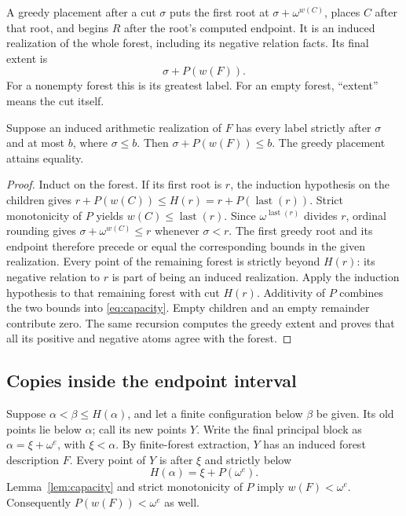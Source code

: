 \documentclass[11pt]{article}
\begin{document}
A greedy placement after a cut $\sigma$ puts the first root at
$\sigma+\omega^{w(C)}$, places $C$ after that root, and begins $R$
after the root's computed endpoint. It is an induced realization of the
whole forest, including its negative relation facts. Its final extent is
\begin{equation}\label{eq:capacity}
 \sigma+P(w(F)).
\end{equation}
For a nonempty forest this is its greatest label. For an empty forest,
``extent'' means the cut itself.

\begin{lemma}\label{lem:capacity}
Suppose an induced arithmetic realization of $F$ has every label strictly
after $\sigma$ and at most $b$, where $\sigma\leq b$. Then
$\sigma+P(w(F))\leq b$. The greedy placement attains equality.
\end{lemma}

\begin{proof}
Induct on the forest. If its first root is $r$, the induction hypothesis
on the children gives
$r+P(w(C))\leq H(r)=r+P(\operatorname{last}(r))$.
Strict monotonicity of $P$ yields
$w(C)\leq\operatorname{last}(r)$. Since
$\omega^{\operatorname{last}(r)}$ divides $r$, ordinal rounding gives
$\sigma+\omega^{w(C)}\leq r$ whenever $\sigma<r$.
The first greedy root and its endpoint therefore precede or equal the
corresponding bounds in the given realization. Every point of the
remaining forest is strictly beyond $H(r)$: its negative relation to
$r$ is part of being an induced realization. Apply the induction
hypothesis to that remaining forest with cut $H(r)$. Additivity of $P$
combines the two bounds into \eqref{eq:capacity}. Empty children and an
empty remainder contribute zero. The same recursion computes the greedy
extent and proves that all its positive and negative atoms agree with
the forest.
\end{proof}

\subsection{Copies inside the endpoint interval}

Suppose $\alpha<\beta\leq H(\alpha)$, and let a finite configuration
below $\beta$ be given. Its old points lie below $\alpha$; call its new
points $Y$. Write the final principal block as
$\alpha=\xi+\omega^e$, with $\xi<\alpha$.
By finite-forest extraction, $Y$ has an induced forest description $F$.
Every point of $Y$ is after $\xi$ and strictly below
\[
 H(\alpha)=\xi+P(\omega^e).
\]
Lemma~\ref{lem:capacity} and strict monotonicity of $P$ imply
$w(F)<\omega^e$. Consequently $P(w(F))<\omega^e$ as well.
\end{document}

